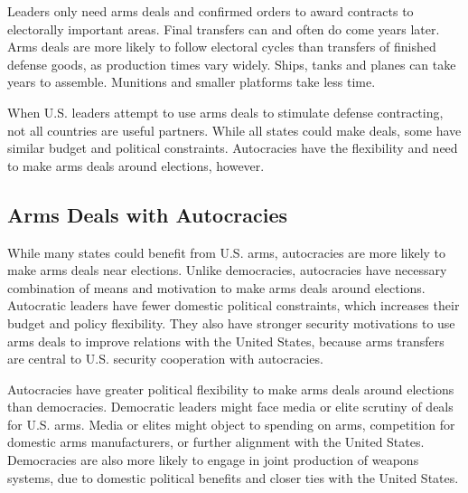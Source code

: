 \documentclass[12pt]{article}
\begin{document}
Leaders only need arms deals and confirmed orders to award contracts to electorally important areas.
Final transfers can and often do come years later. 
Arms deals are more likely to follow electoral cycles than transfers of finished defense goods, as production times vary widely. 
Ships, tanks and planes can take years to assemble.
Munitions and smaller platforms take less time. 


When U.S. leaders attempt to use arms deals to stimulate defense contracting, not all countries are useful partners. 
While all states could make deals, some have similar budget and political constraints. 
Autocracies have the flexibility and need to make arms deals around elections, however.



\subsection{Arms Deals with Autocracies}


While many states could benefit from U.S. arms, autocracies are more likely to make arms deals near elections. 
Unlike democracies, autocracies have necessary combination of means and motivation to make arms deals around elections.
Autocratic leaders have fewer domestic political constraints, which increases their budget and policy flexibility. 
They also have stronger security motivations to use arms deals to improve relations with the United States, because arms transfers are central to U.S. security cooperation with autocracies.




Autocracies have greater political flexibility to make arms deals around elections than democracies. 
Democratic leaders might face media or elite scrutiny of deals for U.S. arms.
Media or elites might object to spending on arms, competition for domestic arms manufacturers, or further alignment with the United States.
Democracies are also more likely to engage in joint production of weapons systems, due to domestic political benefits and closer ties with the United States.
\end{document}
